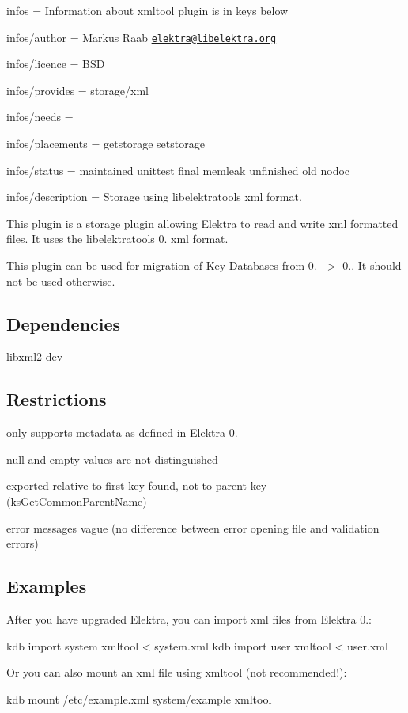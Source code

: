 
\begin{DoxyItemize}
\item infos = Information about xmltool plugin is in keys below
\item infos/author = Markus Raab \href{mailto:elektra@libelektra.org}{\tt elektra@libelektra.\+org}
\item infos/licence = B\+SD
\item infos/provides = storage/xml
\item infos/needs =
\item infos/placements = getstorage setstorage
\item infos/status = maintained unittest final memleak unfinished old nodoc
\item infos/description = Storage using libelektratools xml format.
\end{DoxyItemize}

This plugin is a storage plugin allowing Elektra to read and write xml formatted files. It uses the {\ttfamily libelektratools} 0. xml format.

This plugin can be used for migration of Key Databases from 0. -\/$>$ 0.. It should not be used otherwise.

\subsection*{Dependencies}


\begin{DoxyItemize}
\item {\ttfamily libxml2-\/dev}
\end{DoxyItemize}

\subsection*{Restrictions}


\begin{DoxyItemize}
\item only supports metadata as defined in Elektra 0.
\item null and empty values are not distinguished
\item exported relative to first key found, not to parent key (ks\+Get\+Common\+Parent\+Name)
\item error messages vague (no difference between error opening file and validation errors)
\end{DoxyItemize}

\subsection*{Examples}

After you have upgraded Elektra, you can import xml files from Elektra 0.\+: \begin{DoxyVerb}kdb import system xmltool < system.xml
kdb import user xmltool < user.xml
\end{DoxyVerb}


Or you can also mount an xml file using {\ttfamily xmltool} (not recommended!)\+: \begin{DoxyVerb}kdb mount /etc/example.xml system/example xmltool\end{DoxyVerb}
 